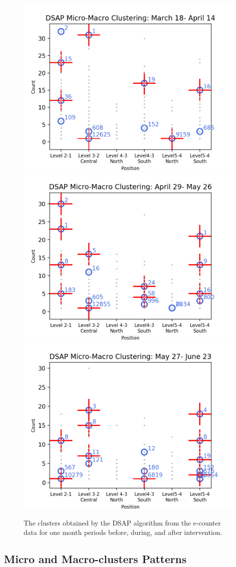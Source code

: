 \begin{figure}[!t]
    \centering
    \includegraphics[width=.47\textwidth]{image/Chapters/Chapter6/BeforeInte1month.png}
    \includegraphics[width=.47\textwidth]{image/Chapters/Chapter6/duringInte1month.png}
    \includegraphics[width=.47\textwidth]{image/Chapters/Chapter6/afterInte1month.png}
    \caption{The clusters obtained by the DSAP algorithm from the e-counter data for one month periods before, during, and after intervention.}
    \label{dsap3mon}
\end{figure}


\subsection{Micro and Macro-clusters Patterns}




